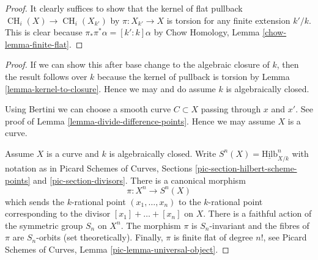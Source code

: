 \documentclass[10pt,a4paper]{amsart}
\theoremstyle{plain}
\theoremstyle{definition}
\theoremstyle{remark}
\numberwithin{equation}{subsection}
\def\CH{\mathop{\mathrm{CH}}\nolimits}
\def\Hilbfunctor{\mathrm{Hilb}}
\begin{document}
\begin{proof}
It clearly suffices to show that the kernel
of flat pullback $\CH_i(X) \to \CH_i(X_{k'})$
by $\pi : X_{k'} \to X$ is torsion
for any finite extension $k'/k$. This is clear because
$\pi_* \pi^* \alpha = [k' : k] \alpha$ by
Chow Homology, Lemma \ref{chow-lemma-finite-flat}.
\end{proof}

\begin{proof}
If we can show this after base change to the algebraic closure of $k$,
then the result follows over $k$ because the kernel of pullback
is torsion by Lemma \ref{lemma-kernel-to-closure}.
Hence we may and do assume $k$ is algebraically closed.

\medskip\noindent
Using Bertini we can choose a smooth curve $C \subset X$ passing through
$x$ and $x'$. See proof of Lemma \ref{lemma-divide-difference-points}.
Hence we may assume $X$ is a curve.

\medskip\noindent
Assume $X$ is a curve and $k$ is algebraically closed.
Write $S^n(X) = \underline{\Hilbfunctor}^n_{X/k}$ with notation as in
Picard Schemes of Curves, Sections \ref{pic-section-hilbert-scheme-points}
and \ref{pic-section-divisors}. There is a canonical morphism
$$
\pi : X^n \longrightarrow S^n(X)
$$
which sends the $k$-rational point $(x_1, \ldots, x_n)$ to the $k$-rational
point corresponding to the divisor $[x_1] + \ldots + [x_n]$ on $X$.
There is a faithful action of the symmetric group $S_n$ on $X^n$.
The morphism $\pi$ is $S_n$-invariant and the fibres of $\pi$ are
$S_n$-orbits (set theoretically). Finally, $\pi$ is finite flat of
degree $n!$, see Picard Schemes of Curves, Lemma
\ref{pic-lemma-universal-object}.


\end{proof}
\end{document}
